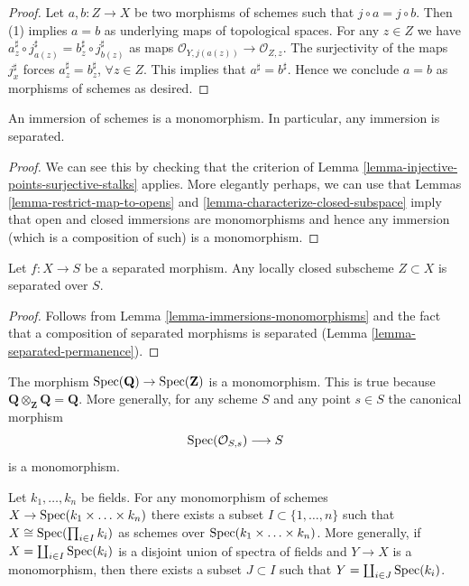 \begin{proof}
Let $a, b : Z \to X$ be two morphisms of schemes such that
$j \circ a  = j \circ b$.
Then (1) implies $a = b$ as underlying
maps of topological spaces.
For any $z \in Z$ we have
$a^\sharp_z \circ j^\sharp_{a(z)} = b^\sharp_z \circ j^\sharp_{b(z)}$
as maps $\mathcal{O}_{Y, j(a(z))} \to \mathcal{O}_{Z, z}$.
The surjectivity of the maps
$j^\sharp_x$ forces $a^\sharp_z = b^\sharp_z$, $\forall z \in Z$.
This implies that $a^\sharp = b^\sharp$.
Hence we conclude $a = b$ as morphisms of schemes
as desired.
\end{proof}

\begin{lemma}
\label{lemma-immersions-monomorphisms}
An immersion of schemes is a monomorphism.
In particular, any immersion is separated.
\end{lemma}

\begin{proof}
We can see this by checking that the criterion of
Lemma \ref{lemma-injective-points-surjective-stalks} applies.
More elegantly perhaps, we can use that
Lemmas \ref{lemma-restrict-map-to-opens} and
\ref{lemma-characterize-closed-subspace} imply that
open and closed immersions are monomorphisms and hence
any immersion (which is a composition of such)
is a monomorphism.
\end{proof}

\begin{lemma}
\label{lemma-subscheme-of-separated-scheme}
Let $f : X \to S$ be a separated morphism.
Any locally closed subscheme $Z \subset X$ is separated over $S$.
\end{lemma}

\begin{proof}
Follows from Lemma \ref{lemma-immersions-monomorphisms}
and the fact that a composition of separated morphisms is separated
(Lemma \ref{lemma-separated-permanence}).
\end{proof}

\begin{example}
\label{example-Q-over-Z}
The morphism $\mathop{\mathrm{Spec}}(\mathbf{Q}) \to \mathop{\mathrm{Spec}}(\mathbf{Z})$
is a monomorphism. This is true because
$\mathbf{Q} \otimes_{\mathbf{Z}} \mathbf{Q} = \mathbf{Q}$.
More generally, for any scheme $S$ and any point $s \in S$ the
canonical morphism
$$
\mathop{\mathrm{Spec}}(\mathcal{O}_{S, s}) \longrightarrow S
$$
is a monomorphism.
\end{example}

\begin{lemma}
\label{lemma-mono-towards-spec-field}
Let $k_1, \ldots, k_n$ be fields.
For any monomorphism of schemes
$X \to \mathop{\mathrm{Spec}}(k_1 \times \ldots \times k_n)$
there exists a subset $I \subset \{1, \ldots, n\}$ such
that $X \cong \mathop{\mathrm{Spec}}(\prod_{i \in I} k_i)$ as
schemes over $\mathop{\mathrm{Spec}}(k_1 \times \ldots \times k_n)$.
More generally, if $X = \coprod_{i \in I} \mathop{\mathrm{Spec}}(k_i)$
is a disjoint union of spectra of fields and $Y \to X$ is a monomorphism,
then there exists a subset $J \subset I$ such that
$Y = \coprod_{i \in J} \mathop{\mathrm{Spec}}(k_i)$.
\end{lemma}

